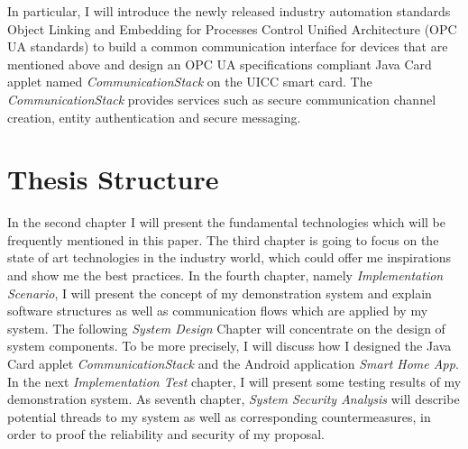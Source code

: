 In particular, I will introduce the newly released industry automation standards Object Linking and Embedding for Processes Control Unified Architecture (OPC UA standards) to build a common communication interface for devices that are mentioned above and design an OPC UA specifications compliant Java Card applet named \emph{CommunicationStack} on the UICC smart card. The \emph{CommunicationStack} provides services such as secure communication channel creation, entity authentication and secure messaging.

\section{Thesis Structure}
In the second chapter I will present the fundamental technologies which will be frequently mentioned in this paper. The third chapter is going to focus on the state of art technologies in the industry world, which could offer me inspirations and show me the best practices. In the fourth chapter, namely \emph{Implementation Scenario}, I will present the concept of my demonstration system and explain software structures as well as communication flows which are applied by my system. The following \emph{System Design} Chapter will concentrate on the design of system components. To be more precisely, I will discuss how I designed the Java Card applet \emph{CommunicationStack} and the Android application \emph{Smart Home App}. In the next \emph{Implementation Test} chapter, I will present some testing results of my demonstration system. As seventh chapter, \emph{System Security Analysis} will describe potential threads to my system as well as corresponding countermeasures, in order to proof the reliability and security of my proposal.